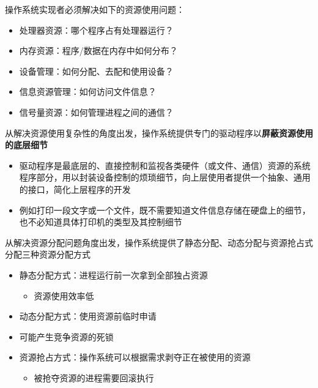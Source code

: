 \documentclass[cs4size,a4paper,10pt]{ctexart}
\begin{document}
		操作系统实现者必须解决如下的资源使用问题：
		\begin{itemize}
			\item 处理器资源：哪个程序占有处理器运行？
			\item 内存资源：程序/数据在内存中如何分布？
			\item 设备管理：如何分配、去配和使用设备？
			\item 信息资源管理：如何访问文件信息？
			\item 信号量资源：如何管理进程之间的通信？
		\end{itemize}

		从解决资源使用复杂性的角度出发，操作系统提供专门的驱动程序以\textbf{屏蔽资源使用的底层细节}
		\begin{itemize}
			\item 驱动程序是最底层的、直接控制和监视各类硬件（或文件、通信）资源的系统程序部分，用以封装设备控制的烦琐细节，向上层使用者提供一个抽象、通用的接口，简化上层程序的开发
			\item 例如打印一段文字或一个文件，既不需要知道文件信息存储在硬盘上的细节，也不必知道具体打印机的类型及其控制细节
		\end{itemize}

		从解决资源分配问题角度出发，操作系统提供了静态分配、动态分配与资源抢占式分配三种资源分配方式
		\begin{itemize}
			\item 静态分配方式：进程运行前一次拿到全部独占资源
			\begin{itemize}
				\item 资源使用效率低
			\end{itemize}
			\item 动态分配方式：使用资源前临时申请
			\item 可能产生竞争资源的死锁
			\item 资源抢占方式：操作系统可以根据需求剥夺正在被使用的资源
			\begin{itemize}
				\item 被抢夺资源的进程需要回滚执行
			\end{itemize}
		\end{itemize}
\end{document}
